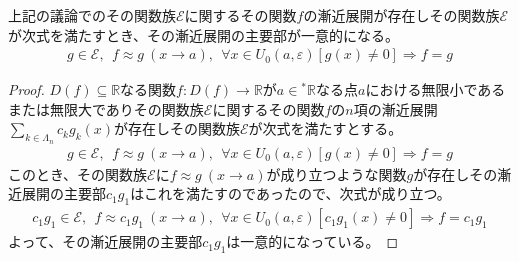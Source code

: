 \documentclass[dvipdfmx]{jsarticle}
\begin{document}
\begin{thm}\label{4.2.4.7}
上記の議論でのその関数族$\mathcal{E}$に関するその関数$f$の漸近展開が存在しその関数族$\mathcal{E}$が次式を満たすとき、その漸近展開の主要部が一意的になる。
\begin{align*}
g\in \mathcal{E,\ \ }f \approx g\ (x \rightarrow a),\ \ \forall x \in U_{0}(a,\varepsilon)\left[ g(x) \neq 0 \right] \Rightarrow f = g
\end{align*}
\end{thm}
\begin{proof}
$D(f) \subseteq \mathbb{R}$なる関数$f:D(f) \rightarrow \mathbb{R}$が$a \in{}^{*}\mathbb{R}$なる点$a$における無限小であるまたは無限大でありその関数族$\mathcal{E}$に関するその関数$f$の$n$項の漸近展開$\sum_{k \in \varLambda_{n}} {c_{k}g_{k}(x)}$が存在しその関数族$\mathcal{E}$が次式を満たすとする。
\begin{align*}
g\in \mathcal{E,\ \ }f \approx g\ (x \rightarrow a),\ \ \forall x \in U_{0}(a,\varepsilon)\left[ g(x) \neq 0 \right] \Rightarrow f = g
\end{align*}
このとき、その関数族$\mathcal{E}$に$f \approx g\ (x \rightarrow a)$が成り立つような関数$g$が存在しその漸近展開の主要部$c_{1}g_{1}$はこれを満たすのであったので、次式が成り立つ。
\begin{align*}
c_{1}g_{1}\in \mathcal{E,\ \ }f \approx c_{1}g_{1}\ (x \rightarrow a),\ \ \forall x \in U_{0}(a,\varepsilon)\left[ c_{1}g_{1}(x) \neq 0 \right] \Rightarrow f = c_{1}g_{1}
\end{align*}
よって、その漸近展開の主要部$c_{1}g_{1}$は一意的になっている。
\end{proof}
\end{document}
